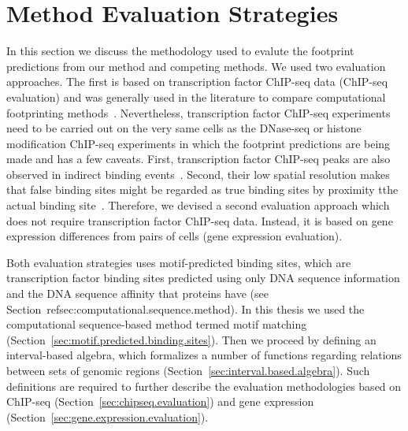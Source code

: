 \section{Method Evaluation Strategies}
\label{sec:method.evaluation.strategies}

In this section we discuss the methodology used to evalute the footprint predictions from our method and competing methods. We used two evaluation approaches. The first is based on transcription factor ChIP-seq data (ChIP-seq evaluation) and was generally used in the literature to compare computational footprinting methods~\cite{pique2011,boyle2011,cuellar2012}. Nevertheless, transcription factor ChIP-seq experiments need to be carried out on the very same cells as the DNase-seq or histone modification ChIP-seq experiments in which the footprint predictions are being made and has a few caveats. First, transcription factor ChIP-seq peaks are also observed in indirect binding events~\cite{yardimci2014}. Second, their low spatial resolution makes that false binding sites might be regarded as true binding sites by proximity tthe actual binding site~\cite{cuellar2012,yardimci2014}. Therefore, we devised a second evaluation approach which does not require transcription factor ChIP-seq data. Instead, it is based on gene expression differences from pairs of cells (gene expression evaluation).

Both evaluation strategies uses motif-predicted binding sites, which are transcription factor binding sites predicted using only DNA sequence information and the DNA sequence affinity that proteins have (see Section~ref{sec:computational.sequence.method}). In this thesis we used the computational sequence-based method termed motif matching (Section~\ref{sec:motif.predicted.binding.sites}). Then we proceed by defining an interval-based algebra, which formalizes a number of functions regarding relations between sets of genomic regions (Section~\ref{sec:interval.based.algebra}). Such definitions are required to further describe the evaluation methodologies based on ChIP-seq (Section~\ref{sec:chipseq.evaluation}) and gene expression (Section~\ref{sec:gene.expression.evaluation}).

